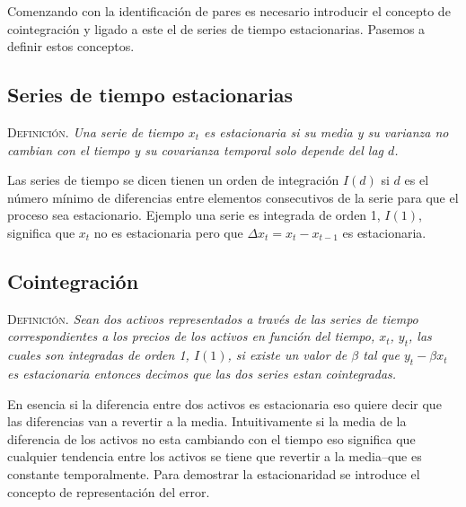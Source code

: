 \documentclass{myarticle}
\begin{document}
Comenzando con la identificaci\'on de pares es necesario introducir el concepto de cointegraci\'on y ligado a este el de series de tiempo estacionarias. Pasemos a definir estos conceptos.


\subsection{Series de tiempo estacionarias}
\label{sec:org2946d4f}
{\scshape Definici\'on.} {\em Una serie de tiempo \(x_t\) es estacionaria si su media y su varianza no cambian con el tiempo y su covarianza temporal  solo depende del lag \(d\).}


Las series de tiempo se dicen tienen un orden de integraci\'on \(I(d)\) si \(d\) es el n\'umero m\'inimo de diferencias entre elementos consecutivos de la serie para que el proceso sea estacionario. Ejemplo una serie es integrada de orden 1, \(I(1)\), significa que \(x_t\) no es estacionaria pero que \(\Delta x_t = x_t-x_{t-1}\) es estacionaria.

\subsection{Cointegraci\'on}
\label{sec:org5b2e9bc}

{\scshape Definici\'on.} {\em Sean dos activos representados a trav\'es de las series de tiempo correspondientes a los precios de los activos en funci\'on del tiempo, \(x_t\), \(y_t\), las cuales son integradas de orden 1, \(I(1)\), si existe un valor de \(\beta\) tal que \(y_t-\beta x_t\) es estacionaria entonces decimos que las dos series estan cointegradas.}

En esencia si la diferencia entre dos activos es estacionaria eso quiere decir que las diferencias van a revertir a la media. Intuitivamente si la media de la diferencia de los activos no esta cambiando con el tiempo eso significa que cualquier tendencia entre los activos se tiene que revertir a la media--que es constante temporalmente. Para demostrar la estacionaridad se introduce el concepto de representaci\'on del error.
\end{document}
